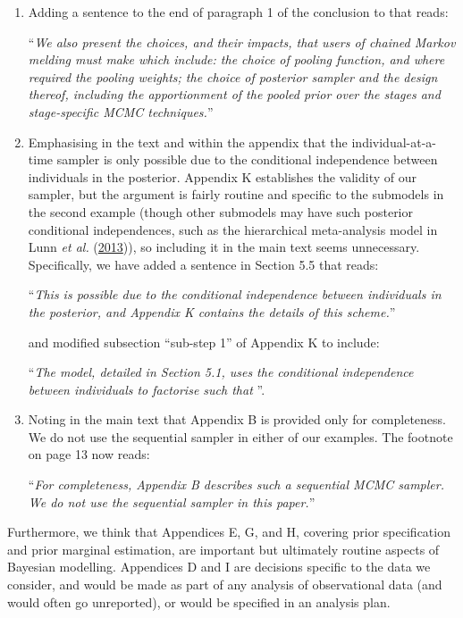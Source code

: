 \documentclass[
  10pt,
  a4paper,
]{article}
\begin{document}
\begin{enumerate}
\def\labelenumi{\arabic{enumi}.}
\item
  Adding a sentence to the end of paragraph 1 of the conclusion to that
  reads:

  ``\emph{We also present the choices, and their impacts, that users of
  chained Markov melding must make which include: the choice of pooling
  function, and where required the pooling weights; the choice of
  posterior sampler and the design thereof, including the apportionment
  of the pooled prior over the stages and stage-specific MCMC
  techniques.}''
\item
  Emphasising in the text and within the appendix that the
  individual-at-a-time sampler is only possible due to the conditional
  independence between individuals in the posterior. Appendix K
  establishes the validity of our sampler, but the argument is fairly
  routine and specific to the submodels in the second example (though
  other submodels may have such posterior conditional independences,
  such as the hierarchical meta-analysis model in Lunn \emph{et al.}
  (\protect\hyperlink{ref-lunn:etal:13}{2013})), so including it in the
  main text seems unnecessary. Specifically, we have added a sentence in
  Section 5.5 that reads:

  ``\emph{This is possible due to the conditional independence between
  individuals in the posterior, and Appendix K contains the details of
  this scheme.}''

  and modified subsection ``sub-step 1'' of Appendix K to include:

  ``\emph{The model, detailed in Section 5.1, uses the conditional
  independence between individuals to factorise such that
  \textellipsis}''.
\item
  Noting in the main text that Appendix B is provided only for
  completeness. We do not use the sequential sampler in either of our
  examples. The footnote on page 13 now reads:

  ``\emph{For completeness, Appendix B describes such a sequential MCMC
  sampler. We do not use the sequential sampler in this paper.}''
\end{enumerate}

Furthermore, we think that Appendices E, G, and H, covering prior
specification and prior marginal estimation, are important but
ultimately routine aspects of Bayesian modelling. Appendices D and I are
decisions specific to the data we consider, and would be made as part of
any analysis of observational data (and would often go unreported), or
would be specified in an analysis plan.
\end{document}
